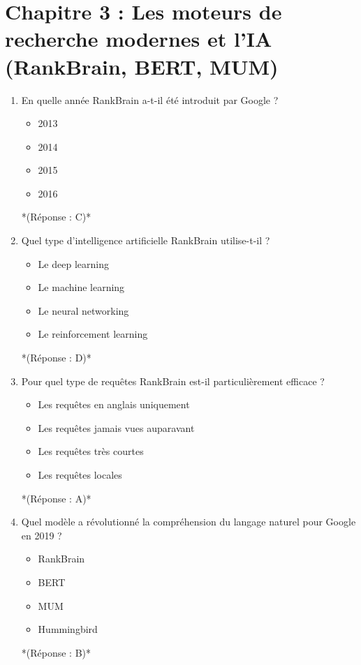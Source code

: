 \documentclass[12pt,a4paper,twoside]{report}
\begin{document}
\newpage

\section*{Chapitre 3 : Les moteurs de recherche modernes et l'IA (RankBrain, BERT, MUM)}

\begin{enumerate}
\item En quelle année RankBrain a-t-il été introduit par Google ?
\begin{itemize}
\item[A)] 2013
\item[B)] 2014
\item[C)] 2015
\item[D)] 2016
\end{itemize}
*(Réponse : C)*

\item Quel type d'intelligence artificielle RankBrain utilise-t-il ?
\begin{itemize}
\item[A)] Le deep learning
\item[B)] Le machine learning
\item[C)] Le neural networking
\item[D)] Le reinforcement learning
\end{itemize}
*(Réponse : D)*

\item Pour quel type de requêtes RankBrain est-il particulièrement efficace ?
\begin{itemize}
\item[A)] Les requêtes en anglais uniquement
\item[B)] Les requêtes jamais vues auparavant
\item[C)] Les requêtes très courtes
\item[D)] Les requêtes locales
\end{itemize}
*(Réponse : A)*

\item Quel modèle a révolutionné la compréhension du langage naturel pour Google en 2019 ?
\begin{itemize}
\item[A)] RankBrain
\item[B)] BERT
\item[C)] MUM
\item[D)] Hummingbird
\end{itemize}
*(Réponse : B)*


\end{enumerate}
\end{document}

